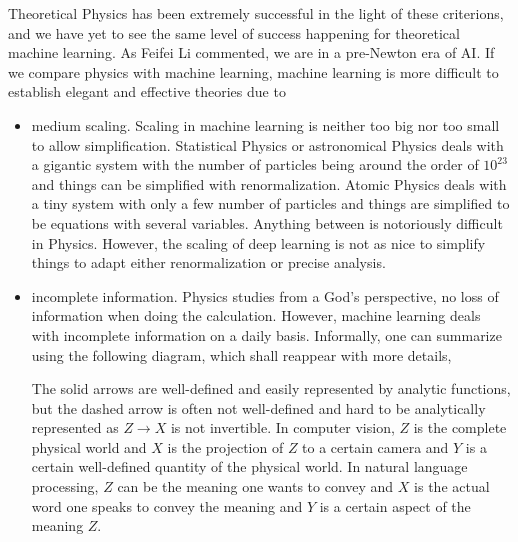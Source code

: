 \documentclass[11pt, oneside]{article}   	%
\theoremstyle{definition}
\begin{document}
Theoretical Physics has been extremely successful in the light of these criterions, and we have yet to see the same level of success happening for theoretical machine learning. As Feifei Li commented, we are in a pre-Newton era of AI. If we compare physics with machine learning, machine learning is more difficult to establish elegant and effective theories due to
\begin{itemize}
	\item medium scaling. Scaling in machine learning is neither too big nor too small to allow simplification. Statistical Physics or astronomical Physics deals with a gigantic system with the number of particles being around the order of $10^{23}$ and things can be simplified with renormalization. Atomic Physics deals with a tiny system with only a few number of particles and things are simplified to be equations with several variables. Anything between is notoriously difficult in Physics. However, the scaling of deep learning is not as nice to simplify things to adapt either renormalization or precise analysis.
	\item incomplete information. Physics studies from a God's perspective, no loss of information when doing the calculation. However, machine learning deals with incomplete information on a daily basis. Informally, one can summarize using the following diagram, which shall reappear with more details,
	\begin{center}
	\end{center}

	The solid arrows are well-defined and easily represented by analytic functions, but the dashed arrow is often not well-defined and hard to be analytically represented as $Z \to X$ is not invertible. In computer vision, $Z$ is the complete physical world and $X$ is the projection of $Z$ to a certain camera and $Y$ is a certain well-defined quantity of the physical world. In natural language processing, $Z$ can be the meaning one wants to convey and $X$ is the actual word one speaks to convey the meaning and $Y$ is a certain aspect of the meaning $Z$.
\end{itemize}
\end{document}
